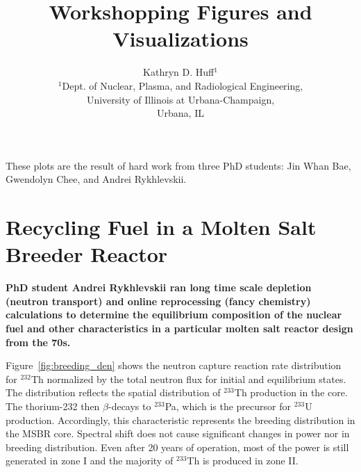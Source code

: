 \documentclass{article}
\begin{document}
\title{Workshopping Figures and Visualizations}
\author{Kathryn D. Huff$^{1}$\\
        $^{1}$Dept. of Nuclear, Plasma, and Radiological Engineering, \\
University of Illinois at Urbana-Champaign, \\
Urbana, IL}

\date{}
\maketitle 
These plots are the result of hard work from three PhD students: Jin Whan Bae, Gwendolyn 
Chee, and Andrei Rykhlevskii.

\section*{Recycling Fuel in a Molten Salt Breeder Reactor \cite{rykhlevskii_modeling_2018}}

\textbf{PhD student Andrei Rykhlevskii ran long time scale depletion (neutron 
transport) and online reprocessing (fancy chemistry) calculations to determine 
the equilibrium composition of the nuclear fuel and other characteristics in a 
particular molten salt reactor design from the 70s.} 

Figure~\ref{fig:breeding_den} shows the neutron capture reaction rate
distribution for $^{232}$Th normalized by the total neutron flux for initial
and equilibrium states. The distribution reflects the spatial distribution of
$^{233}$Th production in the core. The thorium-232 then $\beta$-decays to
$^{233}$Pa, which is the precursor for $^{233}$U production. Accordingly, this
characteristic represents the breeding distribution in the \gls{MSBR} core.
Spectral shift does not cause significant changes in power nor in breeding
distribution. Even after 20 years of operation, most of the power is still
generated in zone I and the majority of $^{233}$Th is
produced in zone II.
\end{document}
